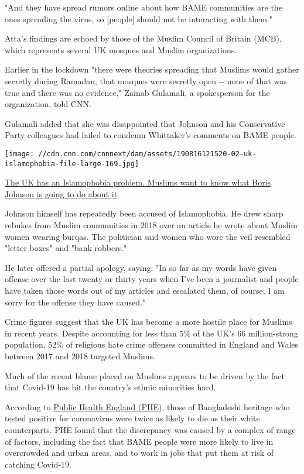 "And they have spread rumors online about how BAME communities are the
ones spreading the virus, so {[}people{]} should not be interacting with
them."

Atta's findings are echoed by those of the Muslim Council of Britain
(MCB), which represents several UK mosques and Muslim organizations.

Earlier in the lockdown "there were theories spreading that Muslims
would gather secretly during Ramadan, that mosques were secretly open
-\/- none of that was true and there was no evidence," Zainab Gulamali,
a spokesperson for the organization, told CNN.

Gulamali added that she was disappointed that Johnson and his
Conservative Party colleagues had failed to condemn Whittaker's comments
on BAME people.

\href{/2019/08/18/uk/uk-islamophobia-boris-johnson-gbr-intl/index.html}{}

\texttt{[image: //cdn.cnn.com/cnnnext/dam/assets/190816121520-02-uk-islamophobia-file-large-169.jpg]}

\href{/2019/08/18/uk/uk-islamophobia-boris-johnson-gbr-intl/index.html}{The
UK has an Islamophobia problem. Muslims want to know what Boris Johnson
is going to do about it}

Johnson himself has repeatedly been accused of Islamophobia. He drew
sharp rebukes from Muslim communities in 2018 over an article he wrote
about Muslim women wearing burqas. The politician said women who wore
the veil resembled "letter boxes" and "bank robbers."

He later offered a partial apology, saying: "In so far as my words have
given offense over the last twenty or thirty years when I've been a
journalist and people have taken those words out of my articles and
escalated them, of course, I am sorry for the offense they have caused."

Crime figures suggest that the UK has become a more hostile place for
Muslims in recent years. Despite accounting for less than 5\% of the
UK's 66 million-strong population, 52\% of religious hate crime offenses
committed in England and Wales between 2017 and 2018 targeted Muslims.

Much of the recent blame placed on Muslims appears to be driven by the
fact that Covid-19 has hit the country's ethnic minorities hard.

According to
\href{https://cnn.com/2020/06/02/uk/coronavirus-uk-bame-deaths-gbr-intl/index.html}{Public
Health England (PHE}), those of Bangladeshi heritage who tested positive
for coronavirus were twice as likely to die as their white counterparts.
PHE found that the discrepancy was caused by a complex of range of
factors, including the fact that BAME people were more likely to live in
overcrowded and urban areas, and to work in jobs that put them at risk
of catching Covid-19.

